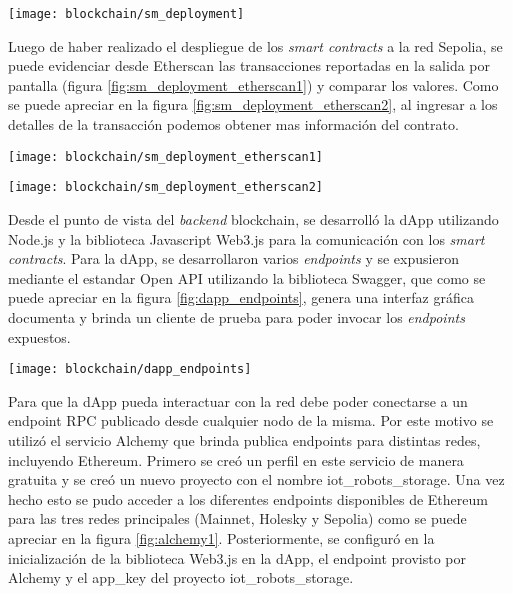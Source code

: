 \begin{center}
   \texttt{[image: blockchain/sm\_deployment]}
   \label{fig:sm_deployment}
\end{center}

Luego de haber realizado el despliegue de los \textit{smart contracts} a la red Sepolia, se puede evidenciar desde Etherscan las transacciones reportadas en la salida por pantalla (figura \ref{fig:sm_deployment_etherscan1}) y comparar los valores. Como se puede apreciar en la figura \ref{fig:sm_deployment_etherscan2}, al ingresar a los detalles de la transacción podemos obtener mas información del contrato.

\begin{center}
   \texttt{[image: blockchain/sm\_deployment\_etherscan1]}
   \label{fig:sm_deployment_etherscan1}
\end{center}

\begin{center}
   \texttt{[image: blockchain/sm\_deployment\_etherscan2]}
   \label{fig:sm_deployment_etherscan2}
\end{center}



Desde el punto de vista del \textit{backend} blockchain, se desarrolló la dApp utilizando Node.js y la biblioteca Javascript Web3.js para la comunicación con los \textit{smart contracts}. Para la dApp, se desarrollaron varios \textit{endpoints} y se expusieron mediante el estandar Open API \citep{open_api} utilizando la biblioteca Swagger, que como se puede apreciar en la figura \ref{fig:dapp_endpoints}, genera una interfaz gráfica documenta y brinda un cliente de prueba para poder invocar los \textit{endpoints} expuestos.

\begin{center}
   \texttt{[image: blockchain/dapp\_endpoints]}
   \label{fig:dapp_endpoints}
\end{center}

Para que la dApp pueda interactuar con la red debe poder conectarse a un endpoint RPC publicado desde cualquier nodo de la misma. Por este motivo se utilizó el servicio Alchemy que brinda publica endpoints para distintas redes, incluyendo Ethereum. Primero se creó un perfil en este servicio de manera gratuita y se creó un nuevo proyecto con el nombre iot\_robots\_storage. Una vez hecho esto se pudo acceder a los diferentes endpoints disponibles de Ethereum para las tres redes principales (Mainnet, Holesky y Sepolia) como se puede apreciar en la figura \ref{fig:alchemy1}. Posteriormente, se configuró en la inicialización de la biblioteca Web3.js en la dApp, el endpoint provisto por Alchemy y el app\_key del proyecto iot\_robots\_storage. 


